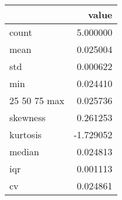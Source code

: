 \begin{tabular}{lr}
\toprule
 & value \\
\midrule
count & 5.000000 \\
mean & 0.025004 \\
std & 0.000622 \\
min & 0.024410 \\
25%
50%
75%
max & 0.025736 \\
skewness & 0.261253 \\
kurtosis & -1.729052 \\
median & 0.024813 \\
iqr & 0.001113 \\
cv & 0.024861 \\
\bottomrule
\end{tabular}
